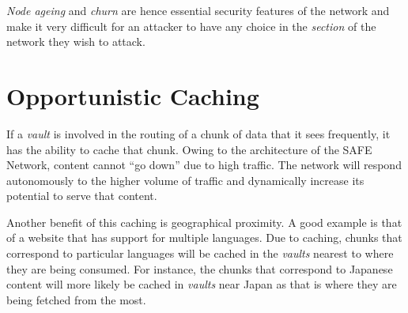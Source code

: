 \textit{Node ageing} and \textit{churn} are hence essential security features of the network and make it very difficult for an attacker to have any choice in the \textit{section} of the network they wish to attack.

\section{Opportunistic Caching}

If a \textit{vault} is involved in the routing of a chunk of data that it sees frequently, it has the ability to cache that chunk. Owing to the architecture of the SAFE Network, content cannot ``go down'' due to high traffic. The network will respond autonomously to the higher volume of traffic and dynamically increase its potential to serve that content.
 
 Another benefit of this caching is geographical proximity. A good example is that of a website that has support for multiple languages. Due to caching, chunks that correspond to particular languages will be cached in the \textit{vaults} nearest to where they are being consumed. For instance, the chunks that correspond to Japanese content will more likely be cached in \textit{vaults} near Japan as that is where they are being fetched from the most.
 